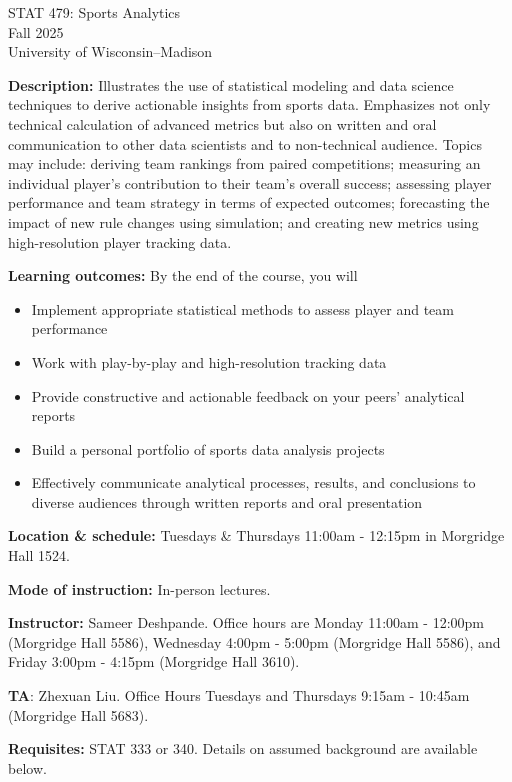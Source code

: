 \documentclass[11pt]{article}
\begin{document}
\begin{center}
\Large{STAT 479: Sports Analytics} \\
\large{Fall 2025} \\
University of Wisconsin--Madison
\end{center}

\singlespacing

\textbf{Description:} Illustrates the use of statistical modeling and data science techniques to derive actionable insights from sports data. Emphasizes not only technical calculation of advanced metrics but also on written and oral communication to other data scientists and to non-technical audience. Topics may include: deriving team rankings from paired competitions; measuring an individual player's contribution to their team's overall success; assessing player performance and team strategy in terms of expected outcomes; forecasting the impact of new rule changes using simulation; and creating new metrics using high-resolution player tracking data.

\textbf{Learning outcomes:} By the end of the course, you will
\begin{itemize}
\item{Implement appropriate statistical methods to assess player and team performance}
\item{Work with play-by-play and high-resolution tracking data}
\item{Provide constructive and actionable feedback on your peers' analytical reports}
\item{Build a personal portfolio of sports data analysis projects}
\item{Effectively communicate analytical processes, results, and conclusions to diverse audiences through written reports and oral presentation} 
\end{itemize}

\textbf{Location \& schedule:} Tuesdays \& Thursdays 11:00am - 12:15pm in Morgridge Hall 1524.

\textbf{Mode of instruction:} In-person lectures.

\textbf{Instructor:} Sameer Deshpande. Office hours are Monday 11:00am - 12:00pm (Morgridge Hall 5586), Wednesday 4:00pm - 5:00pm (Morgridge Hall 5586), and Friday 3:00pm - 4:15pm (Morgridge Hall 3610). 

\textbf{TA}: Zhexuan Liu. Office Hours Tuesdays and Thursdays 9:15am - 10:45am (Morgridge Hall 5683). 

\textbf{Requisites:} STAT 333 or 340. Details on assumed background are available below.
\end{document}
